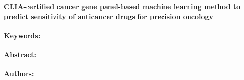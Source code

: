 \noindent
\large {\bf CLIA-certified cancer gene panel-based machine learning method to predict sensitivity of anticancer drugs for precision oncology} 


\normalsize 


\noindent \paragraph{Keywords:} 

\noindent \paragraph{Abstract:} 



\noindent \paragraph{Authors:} 

